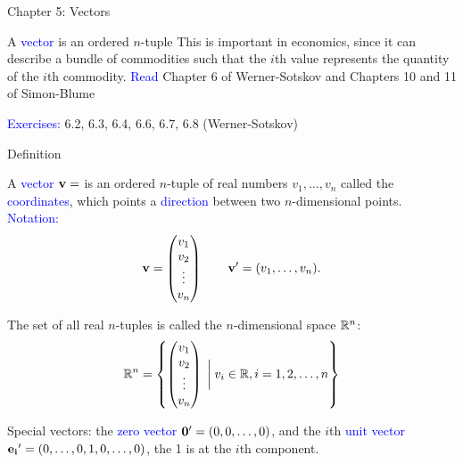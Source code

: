 \documentclass[11pt,aspectratio=169]{beamer}
\begin{document}
\begin{frame}{Chapter 5: Vectors}

A \textcolor{blue}{vector} is an ordered $n$-tuple
\vskip 12pt
This is important in economics, since it can describe a bundle of commodities such that the $i$th value represents the quantity of the $i$th commodity.
\vskip 12pt
\textcolor{blue}{Read}  Chapter 6 of Werner-Sotskov and Chapters 10 and 11 of Simon-Blume
\vskip 12pt

 \textcolor{blue}{Exercises:} 6.2, 6.3, 6.4, 6.6, 6.7, 6.8 (Werner-Sotskov)
\end{frame}

\begin{frame}{Definition}

A \textcolor{blue}{vector} $\bf{v}=$ is an ordered $n$-tuple of real numbers $v_1,\dots,v_n$ called the \textcolor{blue}{coordinates}, which points a \textcolor{blue}{direction} between two $n$-dimensional points.
\textcolor{blue}{Notation:}
\begin{equation*}
{\bf v}=\begin{pmatrix}v_1\\
v_2 \\
\vdots\\
v_n
\end{pmatrix} \qquad  {\bf v}'=(v_1,\ldots,v_n).
\end{equation*}

The set of all real $n$-tuples is called the $n$-dimensional space $\mathbb R^n$: 
\begin{equation*}
\mathbb R^n=\left\{\begin{pmatrix}v_1\\
v_2 \\
\vdots\\
v_n
\end{pmatrix}\;  \bigg\vert \; v_i \in \mathbb R, i=1,2,\dots,n \right\}
\end{equation*}

Special vectors: the \textcolor{blue}{zero vector} ${\bf 0}'=(0,0,\dots,0)$, and the $i$th \textcolor{blue}{unit vector} ${\bf e_i}'=(0,\dots,0,1,0,\dots,0)$, the 1 is at the $i$th component.
\end{frame}
\end{document}
